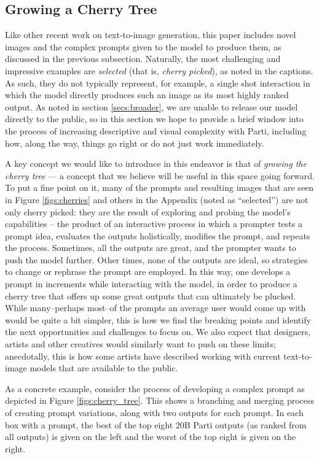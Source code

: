 \subsection{Growing a Cherry Tree}\label{secs:growing_cherry_tree}

Like other recent work on text-to-image generation, this paper includes novel images and the complex prompts given to the model to produce them, as discussed in the previous subsection. Naturally, the most challenging and impressive examples are \textit{selected} (that is, \textit{cherry picked}), as noted in the captions. As such, they do not typically represent, for example, a single shot interaction in which the model directly produces such an image as its most highly ranked output. As noted in section \ref{secs:broader}, we are unable to release our model directly to the public, so in this section we hope to provide a brief window into the process of increasing descriptive and visual complexity with Parti, including how, along the way, things go right or do not just work immediately.

A key concept we would like to introduce in this endeavor is that of \textit{growing the cherry tree} --- a concept that we believe will be useful in this space going forward. To put a fine point on it, many of the prompts and resulting images that are seen in Figure \ref{figs:cherries} and others in the Appendix (noted as ``selected'') are not only cherry picked: they are the result of exploring and probing the model's capabilities -- the product of an interactive process in which a prompter tests a prompt idea, evaluates the outputs holistically, modifies the prompt, and repeats the process. Sometimes, all the outputs are great, and the prompter wants to push the model further. Other times, none of the outputs are ideal, so strategies to change or rephrase the prompt are employed. In this way, one develops a prompt in increments while interacting with the model, in order to produce a cherry tree that offers up some great outputs that can ultimately be plucked. While many--perhaps most--of the prompts an average user would come up with would be quite a bit simpler, this is how we find the breaking points and identify the next opportunities and challenges to focus on. We also expect that designers, artists and other creatives would similarly want to push on these limits; anecdotally, this is how some artists have described working with current text-to-image models that are available to the public.

As a concrete example, consider the process of developing a complex prompt as depicted in Figure \ref{figs:cherry_tree}. This shows a branching and merging process of creating prompt variations, along with two outputs for each prompt. In each box with a prompt, the best of the top eight 20B Parti outputs (as ranked from all outputs) is given on the left and the worst of the top eight is given on the right.

